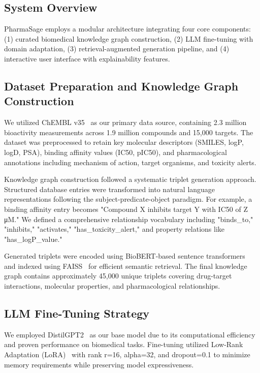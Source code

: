 \documentclass[conference]{IEEEtran}
\begin{document}
\subsection{System Overview}

PharmaSage employs a modular architecture integrating four core components: (1) curated biomedical knowledge graph construction, (2) LLM fine-tuning with domain adaptation, (3) retrieval-augmented generation pipeline, and (4) interactive user interface with explainability features.

\subsection{Dataset Preparation and Knowledge Graph Construction}

We utilized ChEMBL v35~\cite{bento2014chembl} as our primary data source, containing 2.3 million bioactivity measurements across 1.9 million compounds and 15,000 targets. The dataset was preprocessed to retain key molecular descriptors (SMILES, logP, logD, PSA), binding affinity values (IC50, pIC50), and pharmacological annotations including mechanism of action, target organisms, and toxicity alerts.

Knowledge graph construction followed a systematic triplet generation approach. Structured database entries were transformed into natural language representations following the subject-predicate-object paradigm. For example, a binding affinity entry becomes "Compound X inhibits target Y with IC50 of Z μM." We defined a comprehensive relationship vocabulary including "binds\_to," "inhibits," "activates," "has\_toxicity\_alert," and property relations like "has\_logP\_value."

Generated triplets were encoded using BioBERT-based sentence transformers~\cite{reimers2019sentence} and indexed using FAISS~\cite{johnson2019billion} for efficient semantic retrieval. The final knowledge graph contains approximately 45,000 unique triplets covering drug-target interactions, molecular properties, and pharmacological relationships.

\subsection{LLM Fine-Tuning Strategy}

We employed DistilGPT2~\cite{radford2019language} as our base model due to its computational efficiency and proven performance on biomedical tasks. Fine-tuning utilized Low-Rank Adaptation (LoRA)~\cite{hu2021lora} with rank r=16, alpha=32, and dropout=0.1 to minimize memory requirements while preserving model expressiveness.
\end{document}
